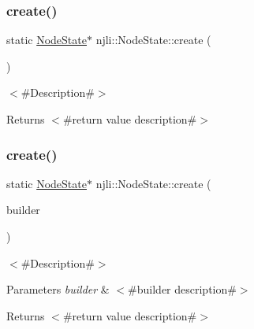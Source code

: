 \subsubsection{\texorpdfstring{create()}{create()}\hspace{0.1cm}{\footnotesize\ttfamily [2/3]}}
{\footnotesize\ttfamily static \mbox{\hyperlink{classnjli_1_1_node_state}{Node\+State}}$\ast$ njli\+::\+Node\+State\+::create (\begin{DoxyParamCaption}{ }\end{DoxyParamCaption})\hspace{0.3cm}{\ttfamily [static]}}

$<$\#\+Description\#$>$

\begin{DoxyReturn}{Returns}
$<$\#return value description\#$>$ 
\end{DoxyReturn}
\mbox{\label{classnjli_1_1_node_state_ab1379ea6f6b5fb0d7c5a38fbeaca7bc5}} 
\subsubsection{\texorpdfstring{create()}{create()}\hspace{0.1cm}{\footnotesize\ttfamily [3/3]}}
{\footnotesize\ttfamily static \mbox{\hyperlink{classnjli_1_1_node_state}{Node\+State}}$\ast$ njli\+::\+Node\+State\+::create (\begin{DoxyParamCaption}\item[{const \mbox{\hyperlink{classnjli_1_1_node_state_builder}{Node\+State\+Builder}} \&}]{builder }\end{DoxyParamCaption})\hspace{0.3cm}{\ttfamily [static]}}

$<$\#\+Description\#$>$


\begin{DoxyParams}{Parameters}
{\em builder} & $<$\#builder description\#$>$\\
\hline
\end{DoxyParams}
\begin{DoxyReturn}{Returns}
$<$\#return value description\#$>$ 
\end{DoxyReturn}
\mbox{\label{classnjli_1_1_node_state_a46f4eb5ad4b0cb11d454d2e17e88f07c}} 
